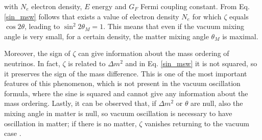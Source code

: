 with $N_e$ electron density, $E$ energy and $G_F$ Fermi coupling constant.
From Eq. \ref{sin_msw} follows that exists a value of electron density $N_e$ for which $\zeta$ equals $\cos 2\theta$, leading to $\sin^2 2\theta_M = 1$. This means that even if the vacuum mixing angle is very small, for a certain density, the matter mixing angle $\theta_M$ is maximal. 

Moreover, the sign of $\zeta$ can give information about the mass ordering of neutrinos. In fact, $\zeta$ is related to $\Delta m^2$ and in Eq. \ref{sin_msw} it is not squared, so it preserves the sign of the mass difference. This is one of the most important features of this phenomenon, which is not present in the vacuum oscillation formula, where the sine is squared and cannot give any information about the mass ordering.
Lastly, it can be observed that, if $\Delta m^2$ or $\theta$ are null, also the mixing angle in matter is null, so vacuum oscillation is necessary to have oscillation in matter; if there is no matter, $\zeta$ vanishes returning to the vacuum case \cite{giunti_kim_fundamental}.



